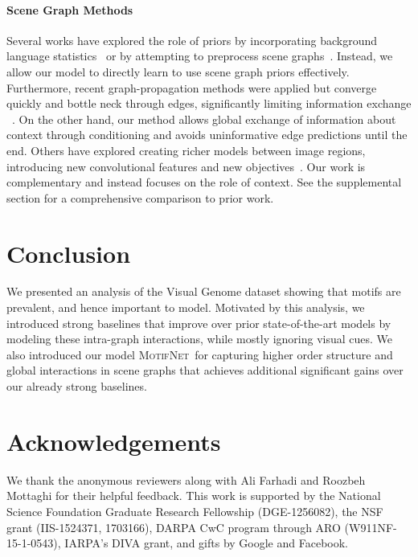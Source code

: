 \documentclass[10pt,twocolumn,letterpaper]{article}
\newcommand{\model}{\textsc{MotifNet}}
\begin{document}
\paragraph{Scene Graph Methods}
Several works have explored the role of priors by incorporating background language statistics~\cite{lu_visual_2016, Yu_2017_ICCV} or by attempting to preprocess scene graphs~\cite{zhang_learning_2016}.
Instead, we allow our model to directly learn to use scene graph priors effectively. 
Furthermore, recent graph-propagation methods were applied but converge quickly and bottle neck through edges, significantly limiting information exchange ~\cite{xu_scene_2017, li2017msdn, Dai2017DetectingVR, li2017vip}.
On the other hand, our method allows global exchange of information about context through conditioning and avoids uninformative edge predictions until the end.
Others have explored creating richer models between image regions, introducing new convolutional features and new objectives~\cite{DBLP:journals/corr/NewellD17,Zhang2017VisualTE, li2017msdn, liang_deep_2017}. Our work is complementary and instead focuses on the role of context. See the supplemental section for a comprehensive comparison to prior work. 
\section{Conclusion}
\label{sec:conclusion}
We presented an analysis of the Visual Genome dataset showing that motifs are prevalent, and hence important to model.
Motivated by this analysis, we introduced strong baselines 
that improve over prior state-of-the-art models by modeling these intra-graph interactions, while mostly ignoring visual cues.
We also introduced our model \model~for capturing higher order structure and global interactions in scene graphs that achieves additional significant gains over our already strong baselines.


\section*{Acknowledgements}
\label{sec:acknowledgements}
We thank the anonymous reviewers along with Ali Farhadi and Roozbeh Mottaghi for their helpful feedback. This work is supported by the National Science Foundation Graduate Research Fellowship (DGE-1256082), the NSF grant (IIS-1524371, 1703166), DARPA CwC program through ARO (W911NF-15-1-0543), IARPA's DIVA grant, and gifts by Google and Facebook.
\end{document}
